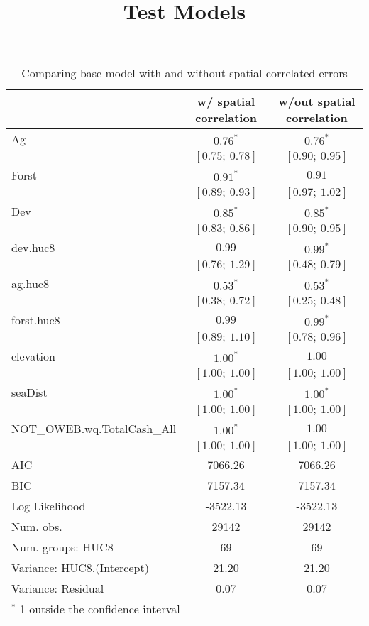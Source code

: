 \documentclass[12pt,a4paper,titlepage]{article}
\title{Test Models}
\begin{document}
\begin{table}
\caption{Comparing base model with and without spatial correlated errors}
\begin{center}
\begin{tabular}{l c c }
\hline
                            & w/ spatial correlation & w/out spatial correlation \\
\hline
Ag                          & $0.76^{*}$      & $0.76^{*}$      \\
                            & $[0.75;\ 0.78]$ & $[0.90;\ 0.95]$ \\
Forst                       & $0.91^{*}$      & $0.91$          \\
                            & $[0.89;\ 0.93]$ & $[0.97;\ 1.02]$ \\
Dev                         & $0.85^{*}$      & $0.85^{*}$      \\
                            & $[0.83;\ 0.86]$ & $[0.90;\ 0.95]$ \\
dev.huc8                    & $0.99$          & $0.99^{*}$      \\
                            & $[0.76;\ 1.29]$ & $[0.48;\ 0.79]$ \\
ag.huc8                     & $0.53^{*}$      & $0.53^{*}$      \\
                            & $[0.38;\ 0.72]$ & $[0.25;\ 0.48]$ \\
forst.huc8                  & $0.99$          & $0.99^{*}$      \\
                            & $[0.89;\ 1.10]$ & $[0.78;\ 0.96]$ \\
elevation                   & $1.00^{*}$      & $1.00$          \\
                            & $[1.00;\ 1.00]$ & $[1.00;\ 1.00]$ \\
seaDist                     & $1.00^{*}$      & $1.00^{*}$      \\
                            & $[1.00;\ 1.00]$ & $[1.00;\ 1.00]$ \\
NOT\_OWEB.wq.TotalCash\_All & $1.00^{*}$      & $1.00$          \\
                            & $[1.00;\ 1.00]$ & $[1.00;\ 1.00]$ \\
\hline
AIC                         & 7066.26         & 7066.26         \\
BIC                         & 7157.34         & 7157.34         \\
Log Likelihood              & -3522.13        & -3522.13        \\
Num. obs.                   & 29142           & 29142           \\
Num. groups: HUC8           & 69              & 69              \\
Variance: HUC8.(Intercept)  & 21.20           & 21.20           \\
Variance: Residual          & 0.07            & 0.07            \\
\hline
\multicolumn{3}{l}{\scriptsize{$^*$ 1 outside the confidence interval}}
\end{tabular}
\label{table:coefficients}
\end{center}
\end{table}
\end{document}
